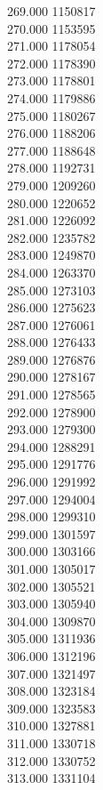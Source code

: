 { 269.000	1150817 \\
 270.000	1153595 \\
 271.000	1178054 \\
 272.000	1178390 \\
 273.000	1178801 \\
 274.000	1179886 \\
 275.000	1180267 \\
 276.000	1188206 \\
 277.000	1188648 \\
 278.000	1192731 \\
 279.000	1209260 \\
 280.000	1220652 \\
 281.000	1226092 \\
 282.000	1235782 \\
 283.000	1249870 \\
 284.000	1263370 \\
 285.000	1273103 \\
 286.000	1275623 \\
 287.000	1276061 \\
 288.000	1276433 \\
 289.000	1276876 \\
 290.000	1278167 \\
 291.000	1278565 \\
 292.000	1278900 \\
 293.000	1279300 \\
 294.000	1288291 \\
 295.000	1291776 \\
 296.000	1291992 \\
 297.000	1294004 \\
 298.000	1299310 \\
 299.000	1301597 \\
 300.000	1303166 \\
 301.000	1305017 \\
 302.000	1305521 \\
 303.000	1305940 \\
 304.000	1309870 \\
 305.000	1311936 \\
 306.000	1312196 \\
 307.000	1321497 \\
 308.000	1323184 \\
 309.000	1323583 \\
 310.000	1327881 \\
 311.000	1330718 \\
 312.000	1330752 \\
 313.000	1331104 \\
}
